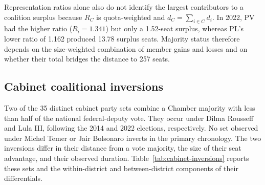 \documentclass[11pt]{article}
\begin{document}
Representation ratios alone also do not identify the largest contributors to a
coalition surplus because $R_C$ is quota-weighted and $d_C=\sum_{i\in C}d_i$.
In 2022, PV had the higher ratio ($R_i=1.341$) but only a 1.52-seat surplus,
whereas PL's lower ratio of 1.162 produced 13.78 surplus seats. Majority status
therefore depends on the size-weighted combination of member gains and losses
and on whether their total bridges the distance to 257 seats.


\subsection{Cabinet coalitional inversions}
\label{sec:cabinets}

Two of the 35 distinct cabinet party sets combine a Chamber majority with
less than half of the national federal-deputy vote. They occur under Dilma
Rousseff and Lula III, following the 2014 and 2022 elections, respectively.
No set observed under Michel Temer or Jair Bolsonaro inverts in the primary
chronology. The two inversions differ in their distance from a vote
majority, the size of their seat advantage, and their observed duration.
Table~\ref{tab:cabinet-inversions} reports these sets and the
within-district and between-district components of their differentials.

\end{document}
